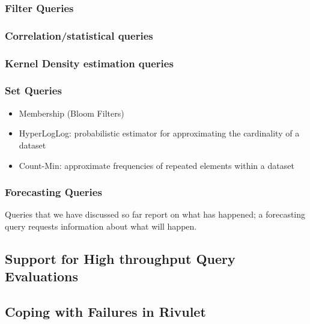 \begin{enumerate}
\end{enumerate}

\subsubsection{Filter Queries}

\subsubsection{Correlation/statistical queries}

\subsubsection{Kernel Density estimation queries}

\subsubsection{Set Queries}
\begin{itemize}
	\item Membership (Bloom Filters)
	\item HyperLogLog: probabilistic estimator for approximating the cardinality of a dataset
	\item Count-Min: approximate frequencies of repeated elements within a dataset
\end{itemize}


\subsubsection{Forecasting Queries}
Queries that we have discussed so far report on what has happened; a forecasting query requests information about what will happen.

\subsection{Support for High throughput Query Evaluations}

\subsection{Coping with Failures in Rivulet}


